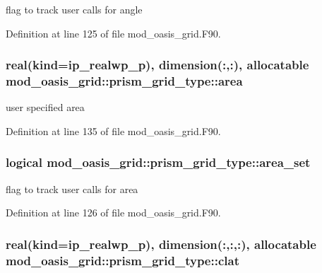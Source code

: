 flag to track user calls for angle 



Definition at line 125 of file mod\+\_\+oasis\+\_\+grid.\+F90.

\hypertarget{structmod__oasis__grid_1_1prism__grid__type_a7dad88f99d9648097a29b6b6f1e25d2e}{
\subsubsection[{area}]{\setlength{\rightskip}{0pt plus 5cm}real(kind=ip\+\_\+realwp\+\_\+p), dimension(\+:,\+:), allocatable mod\+\_\+oasis\+\_\+grid\+::prism\+\_\+grid\+\_\+type\+::area\hspace{0.3cm}{\ttfamily [private]}}}\label{structmod__oasis__grid_1_1prism__grid__type_a7dad88f99d9648097a29b6b6f1e25d2e}


user specified area 



Definition at line 135 of file mod\+\_\+oasis\+\_\+grid.\+F90.

\hypertarget{structmod__oasis__grid_1_1prism__grid__type_a369c091ef9af0281c5b4f92390f4265f}{
\subsubsection[{area\+\_\+set}]{\setlength{\rightskip}{0pt plus 5cm}logical mod\+\_\+oasis\+\_\+grid\+::prism\+\_\+grid\+\_\+type\+::area\+\_\+set\hspace{0.3cm}{\ttfamily [private]}}}\label{structmod__oasis__grid_1_1prism__grid__type_a369c091ef9af0281c5b4f92390f4265f}


flag to track user calls for area 



Definition at line 126 of file mod\+\_\+oasis\+\_\+grid.\+F90.

\hypertarget{structmod__oasis__grid_1_1prism__grid__type_a59d5122daaab45ad6578c7cc8f4fffc8}{
\subsubsection[{clat}]{\setlength{\rightskip}{0pt plus 5cm}real(kind=ip\+\_\+realwp\+\_\+p), dimension(\+:,\+:,\+:), allocatable mod\+\_\+oasis\+\_\+grid\+::prism\+\_\+grid\+\_\+type\+::clat\hspace{0.3cm}{\ttfamily [private]}}}\label{structmod__oasis__grid_1_1prism__grid__type_a59d5122daaab45ad6578c7cc8f4fffc8}


